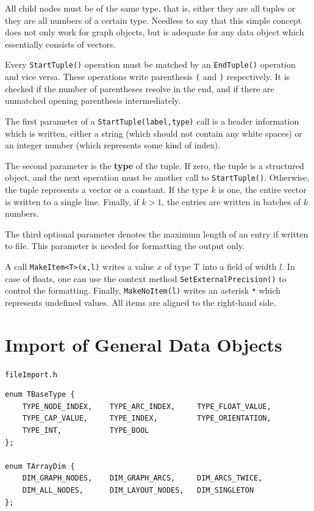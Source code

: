 \documentclass[a4paper,11pt,twoside]{book}
\begin{document}
\begin{multicols}{2}
All child nodes must be of the same type, that is, either they are all tuples
or they are all numbers of a certain type. Needless to say that this simple
concept does not only work for graph objects, but is adequate for any data
object which essentially consists of vectors.

Every \verb/StartTuple()/ operation must be matched by an \verb/EndTuple()/
operation and vice versa. These operations write parenthesis \verb/(/ and
\verb/)/ respectively. It is checked if the number of parentheses resolve
in the end, and if there are unmatched opening parenthesis intermediately.

The first parameter of a \verb/StartTuple(label,type)/ call is a header
information which is written, either a string (which should not contain any
white spaces) or an integer number (which represents some kind of index).

The second parameter is the {\bf type} of the
tuple. If zero, the tuple is a structured object, and the next operation must be another call to
\verb/StartTuple()/. Otherwise, the tuple represents a vector or a constant.
If the type $k$ is one, the entire vector is written to a single line.
Finally, if $k>1$, the entries are written in batches of $k$ numbers.

The third optional parameter denotes the maximum length of an entry if written
to file. This parameter is needed for formatting the output only.

A call \verb/MakeItem<T>(x,l)/ writes a value $x$ of type T into a field of width
$l$. In case of floats, one can use the context method \verb/SetExternalPrecision()/
to control the formatting. Finally, \verb/MakeNoItem(l)/ writes an asterisk \verb/*/
which represents undefined values. All items are aligned to the right-hand side.



\section{Import of General Data Objects}
\myinclude\verb/fileImport.h/
\begin{mymethods}
\begin{verbatim}
enum TBaseType {
    TYPE_NODE_INDEX,    TYPE_ARC_INDEX,     TYPE_FLOAT_VALUE,
    TYPE_CAP_VALUE,     TYPE_INDEX,         TYPE_ORIENTATION,
    TYPE_INT,           TYPE_BOOL
};

enum TArrayDim {
    DIM_GRAPH_NODES,    DIM_GRAPH_ARCS,     DIM_ARCS_TWICE,
    DIM_ALL_NODES,      DIM_LAYOUT_NODES,   DIM_SINGLETON
};


\end{verbatim}
\end{mymethods}
\end{multicols}
\end{document}
